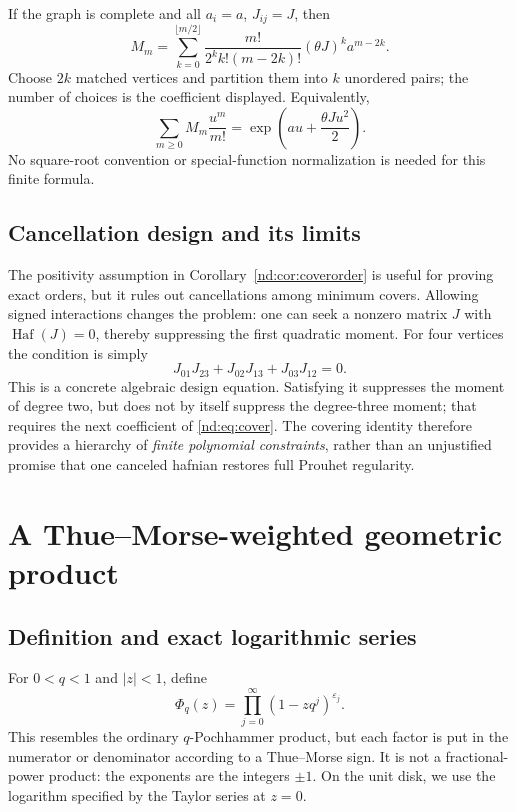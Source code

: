 \documentclass[11pt,a4paper,oneside,openany]{book}
\numberwithin{equation}{chapter}
\theoremstyle{definition}
\theoremstyle{remark}
\newcommand{\eps}{\varepsilon}
\DeclareMathOperator{\Haf}{Haf}
\begin{document}
If the graph is complete and all \(a_i=a\), \(J_{ij}=J\), then
\begin{equation}
 M_m=\sum_{k=0}^{\lfloor m/2\rfloor}
       \frac{m!}{2^k k!(m-2k)!}(\theta J)^k a^{m-2k}.
 \label{nd:eq:completegraph}
\end{equation}
Choose \(2k\) matched vertices and partition them into \(k\) unordered pairs;
the number of choices is the coefficient displayed. Equivalently,
\begin{equation}
 \sum_{m\ge0}M_m\frac{u^m}{m!}
       =\exp\left(au+\frac{\theta J u^2}{2}\right).
 \label{nd:eq:matchEGF}
\end{equation}
No square-root convention or special-function normalization is needed for this
finite formula.

\section{Cancellation design and its limits}
The positivity assumption in Corollary~\ref{nd:cor:coverorder} is useful for
proving exact orders, but it rules out cancellations among minimum covers.
Allowing signed interactions changes the problem: one can seek a nonzero
matrix \(J\) with \(\Haf(J)=0\), thereby suppressing the first quadratic
moment. For four vertices the condition is simply
\[
 J_{01}J_{23}+J_{02}J_{13}+J_{03}J_{12}=0.
\]
This is a concrete algebraic design equation. Satisfying it suppresses the
moment of degree two, but does not by itself suppress the degree-three moment;
that requires the next coefficient of \eqref{nd:eq:cover}. The covering identity
therefore provides a hierarchy of \emph{finite polynomial constraints}, rather
than an unjustified promise that one canceled hafnian restores full Prouhet
regularity.
\chapter{A Thue--Morse-weighted geometric product}
\label{nd:sec:qproduct}

\section{Definition and exact logarithmic series}
For \(0<q<1\) and \(|z|<1\), define
\begin{equation}
 \Phi_q(z)=\prod_{j=0}^{\infty}(1-zq^j)^{\eps_j}.
 \label{nd:eq:Phi}
\end{equation}
This resembles the ordinary \(q\)-Pochhammer product, but each factor is put
in the numerator or denominator according to a Thue--Morse sign. It is not a
fractional-power product: the exponents are the integers \(\pm1\). On the unit
disk, we use the logarithm specified by the Taylor series at \(z=0\).
\end{document}
